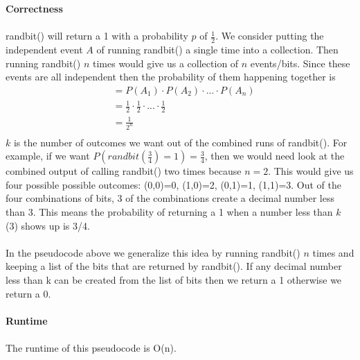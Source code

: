 \documentclass[12pt]{article}
\begin{document}
\begin{enumerate}
\begin{enumerate}
\begin{verbatim}
			\end{verbatim}
			\textbf{Correctness}\\
			\\
			randbit() will return a 1 with a probability $p$ of $\frac{1}{2}$.  
			We consider putting the independent event $A$ of running randbit() a single time into a collection.  
			Then running randbit() $n$ times would give us a collection of $n$ events/bits.
			Since these events are all independent then the probability of them happening together is 
			\begin{align*}
			&= P(A_1) \cdot P(A_2) \cdot ... \cdot P(A_n)\\
			&= \frac{1}{2} \cdot \frac{1}{2} \cdot ... \cdot \frac{1}{2}\\
			&= \frac{1}{2^n}\\
			\end{align*}
			$k$ is the number of outcomes we want out of the combined runs of randbit().  
			For example, if we want $P(randbit(\frac{3}{4})=1)=\frac{3}{4}$, then we would need look at the combined output of calling randbit() two times because $n=2$.
			This would give us four possible possible outcomes: (0,0)=0, (1,0)=2, (0,1)=1, (1,1)=3.  
			Out of the four combinations of bits, 3 of the combinations create a decimal number less than 3.  
      This means the probability of returning a 1 when a number less than $k$ (3) shows up is 3/4.\\ 
			\\
			In the pseudocode above we generalize this idea by running randbit() $n$ times and 
			keeping a list of the bits that are returned by randbit().  If any decimal number less than k can be created
      from the list of bits then we return a 1 otherwise we return a 0.\\
			\\
	    \textbf{Runtime}\\
      \\
      The runtime of this pseudocode is O(n).\\
      \\


\end{enumerate}
\end{enumerate}
\end{document}

